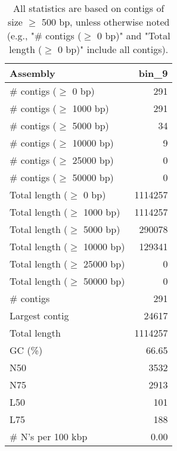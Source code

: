 \documentclass[12pt,a4paper]{article}
\begin{document}
\begin{table}[ht]
\begin{center}
\caption{All statistics are based on contigs of size $\geq$ 500 bp, unless otherwise noted (e.g., "\# contigs ($\geq$ 0 bp)" and "Total length ($\geq$ 0 bp)" include all contigs).}
\begin{tabular}{|l*{1}{|r}|}
\hline
Assembly & bin\_9 \\ \hline
\# contigs ($\geq$ 0 bp) & 291 \\ \hline
\# contigs ($\geq$ 1000 bp) & 291 \\ \hline
\# contigs ($\geq$ 5000 bp) & 34 \\ \hline
\# contigs ($\geq$ 10000 bp) & 9 \\ \hline
\# contigs ($\geq$ 25000 bp) & 0 \\ \hline
\# contigs ($\geq$ 50000 bp) & 0 \\ \hline
Total length ($\geq$ 0 bp) & 1114257 \\ \hline
Total length ($\geq$ 1000 bp) & 1114257 \\ \hline
Total length ($\geq$ 5000 bp) & 290078 \\ \hline
Total length ($\geq$ 10000 bp) & 129341 \\ \hline
Total length ($\geq$ 25000 bp) & 0 \\ \hline
Total length ($\geq$ 50000 bp) & 0 \\ \hline
\# contigs & 291 \\ \hline
Largest contig & 24617 \\ \hline
Total length & 1114257 \\ \hline
GC (\%) & 66.65 \\ \hline
N50 & 3532 \\ \hline
N75 & 2913 \\ \hline
L50 & 101 \\ \hline
L75 & 188 \\ \hline
\# N's per 100 kbp & 0.00 \\ \hline
\end{tabular}
\end{center}
\end{table}
\end{document}
